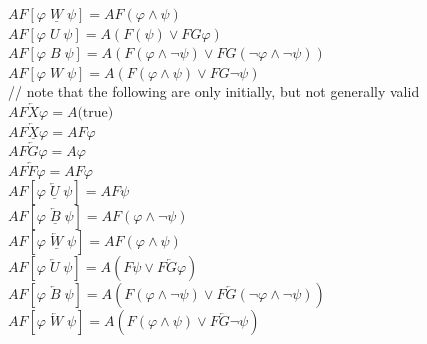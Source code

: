 \documentclass{article}
\begin{document}
\begin{multicols}{4}
$ A F[\varphi \; \underline{W}\; \psi]  = A F(\varphi \wedge \psi)  $\\
$ A F[\varphi \; U\; \psi] = A (F(\psi) \vee  F G \varphi) $\\
$ A F[\varphi \; B\; \psi] = A (F(\varphi \wedge \neg \psi)  \vee  F G (\neg \varphi \wedge \neg \psi) ) $\\
$ A F[\varphi \; W\; \psi] = A (F(\varphi \wedge \psi) \vee  F G \neg \psi )$\\
// note that the following are only initially, but not generally valid\\
$ A F \overleftarrow{X} \varphi = A \text{(true)} $\\
$ A F \underline{\overleftarrow{X}} \varphi = A F \varphi $\\
$ A F \overleftarrow{G} \varphi  = A \varphi $\\
$ A F \overleftarrow{F} \varphi = AF \varphi $\\
$ A F[\varphi \; \underline{\overleftarrow{U}}\; \psi] = AF \psi     $\\
$ A F[\varphi \; \underline{\overleftarrow{B}}\; \psi] = AF(\varphi \wedge \neg \psi)  $\\
$ A F[\varphi \; \underline{\overleftarrow{W}}\; \psi] = AF(\varphi \wedge \psi)    $\\
$ A F[\varphi \; \overleftarrow{U}\; \psi] = A( F \psi \vee  F \overleftarrow{G} \varphi )$\\
$ A F[\varphi \; \overleftarrow{B}\; \psi]  = A ( F(\varphi \wedge \neg \psi)  \vee  F \overleftarrow{G} (\neg \varphi \wedge \neg \psi) )$\\
$ A F[\varphi \; \overleftarrow{W}\; \psi]  =  A(F(\varphi \wedge \psi) \vee  F \overleftarrow{G} \neg \psi )$\\

\end{multicols}
\end{document}
